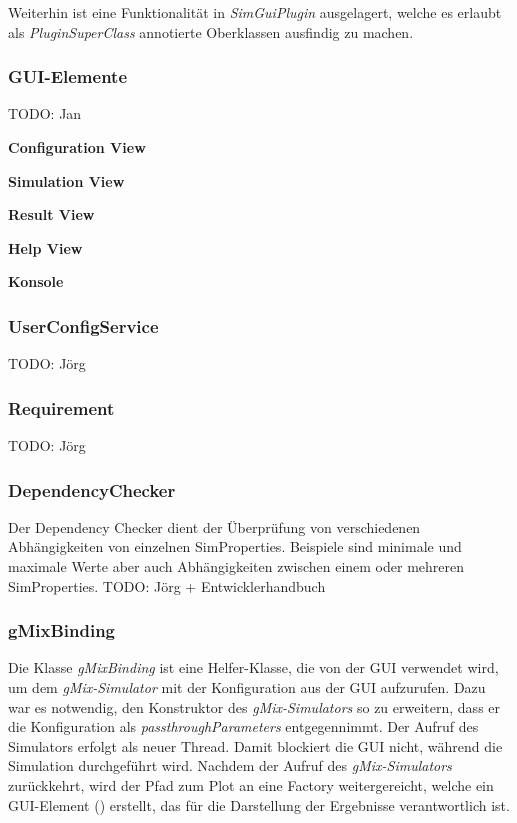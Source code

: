 \documentclass[a4paper, 11pt]{article} %
\begin{document}
Weiterhin ist eine Funktionalität in \emph{SimGuiPlugin} ausgelagert, welche es erlaubt als \emph{PluginSuperClass} annotierte Oberklassen ausfindig zu machen. 

\subsubsection{GUI-Elemente}
\label{sssub:guiservice}
TODO: Jan

\textbf{Configuration View} %
\label{ssub:accordion}

\textbf{Simulation View} %
\label{ssub:accordion}

\textbf{Result View} %
\label{ssub:accordion}

\textbf{Help View} %
\label{ssub:accordion}

\textbf{Konsole} %
\label{ssub:accordion}

\subsubsection{UserConfigService} %
\label{ssub:userconfigservice}
TODO: Jörg

\subsubsection{Requirement} %
\label{ssub:requirement}
TODO: Jörg

\subsubsection{DependencyChecker}
\label{sssub:dependencychecker}
Der Dependency Checker dient der Überprüfung von verschiedenen Abhängigkeiten von einzelnen SimProperties. Beispiele sind minimale und maximale Werte aber auch Abhängigkeiten zwischen einem oder mehreren SimProperties.
TODO: Jörg + Entwicklerhandbuch


\subsubsection{gMixBinding} %
\label{ssub:gmixbinding}
Die Klasse \emph{gMixBinding} ist eine Helfer-Klasse, die von der GUI verwendet wird, um dem \emph{gMix-Simulator} mit der Konfiguration aus der GUI aufzurufen. Dazu war es notwendig, den Konstruktor des \emph{gMix-Simulators} so zu erweitern, dass er die Konfiguration als \emph{passthroughParameters} entgegennimmt. Der Aufruf des Simulators erfolgt als neuer Thread. Damit blockiert die GUI nicht, während die Simulation durchgeführt wird. Nachdem der Aufruf des \emph{gMix-Simulators} zurückkehrt, wird der Pfad zum Plot an eine Factory weitergereicht, welche ein GUI-Element (\emph{}) erstellt, das für die Darstellung der Ergebnisse verantwortlich ist.
\end{document}
